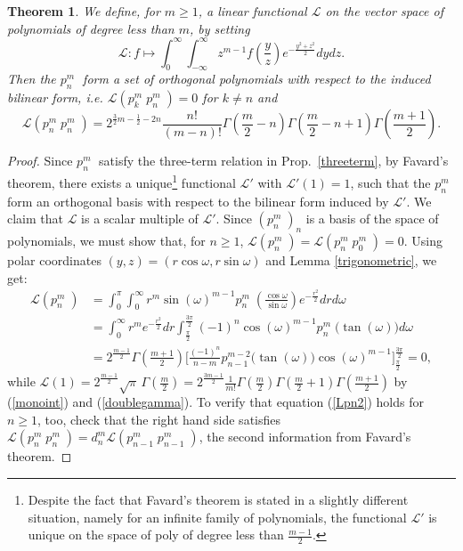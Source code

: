 \documentclass{amsart}
\newcommand{\ie}{{\it i.e. }}
\newcommand{\p}[2]{p_{#1}^{#2}\;\!\!}
\renewcommand{\L}{\mathcal{L}}
\theoremstyle{plain}
\newtheorem{theorem}{Theorem}[section]
\theoremstyle{definition}
\theoremstyle{remark}
\begin{document}
\begin{theorem} \label{pthm}We define, for $m\geq 1$, a linear functional $\L$ on the vector space of polynomials of degree less than $m$, by setting
\begin{equation}
\L: f \longmapsto \int_0^\infty\!\!\! \int_{-\infty}^\infty z^{m-1}f\left(\frac{y}{z}\right) e^{-\frac{y^2+z^2}{2}} dydz.
\end{equation}
Then the $\p{n}{m}$ form a set of orthogonal polynomials with respect to the induced bilinear form, \ie $\L(\p{k}{m}\p{n}{m})=0$ for $k\neq n$ and 
\begin{equation} \label{Lpn2}
\L(\p{n}{m}\p{n}{m}) = 2^{\frac{3}{2}m-\frac{1}{2}-2n}  \frac{n!}{(m-n)!}
\Gamma\left(\frac{m}{2}-n\right)\Gamma\left(\frac{m}{2}-n+1\right)\Gamma\left(\frac{m+1}{2}\right).
\end{equation}
\end{theorem}
\begin{proof}
Since $\p{n}{m}$ satisfy the three-term relation in Prop.~\ref{threeterm}, by Favard's theorem, there exists a unique\footnote{Despite the fact that Favard's theorem is stated in a slightly different situation, namely for an infinite family of polynomials, the functional $\L'$ is unique on the space of poly of degree less than $\frac{m-1}{2}$.} functional $\L'$ with $\L'(1)=1$, such that the $\p{n}{m}$ form an orthogonal basis with respect to the bilinear form induced by $\L'$. We claim that $\L$ is a scalar multiple of $\L'$.
Since $(\p{n}{m})_{n} $ is a basis of the space of polynomials, we must show that, for $n\geq 1$, $\L(\p{n}{m}) = \L(\p{n}{m}\p{0}{m}) =0$.
Using polar coordinates $(y,z) = (r\cos\omega,r\sin\omega)$ and Lemma \ref{trigonometric}, we get:
\begin{align*}
\L(\p{n}{m}) &= \int_0^\pi\!\!\int_0^\infty r^m\sin(\omega)^{m-1} \p{n}{m}\left(\tfrac{\cos\omega}{\sin\omega}\right)e^{-\frac{r^2}{2}}dr d\omega \\
&=\int_0^\infty r^m e^{-\frac{r^2}{2}}dr \int_{\frac{\pi}{2}}^{\frac{3\pi}{2}} (-1)^n \cos(\omega)^{m-1}\p{n}{m}\big(\tan(\omega)\big)d\omega\\
&= 2^{\frac{m-1}{2}}\Gamma\left(\tfrac{m+1}{2}\right)\Big[\tfrac{(-1)^n}{n-m}p_{n-1}^{m-2}\big(\tan(\omega)\big)\cos(\omega)^{m-1} \Big]_{\frac{\pi}{2}}^{\frac{3\pi}{2}} =0,
\end{align*}
while $\L(1) = 2^{\frac{m-1}{2}}\sqrt{\pi}\,\Gamma\!\left(\frac{m}{2}\right)=2^{\frac{3m-1}{2}}  \frac{1}{m!}
\Gamma\left(\frac{m}{2}\right)\Gamma\left(\frac{m}{2}+1\right)\Gamma\left(\frac{m+1}{2}\right)$ by (\ref{monoint}) and (\ref{doublegamma}). To verify that equation (\ref{Lpn2}) holds for $n\geq 1$, too, check that the right hand side satisfies $\L(\p{n}{m}\p{n}{m}) = d_n^m\L(\p{n-1}{m}\p{n-1}{m})$, the second information from Favard's theorem. 
\end{proof}
\end{document}
